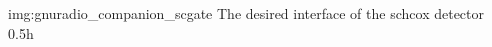 
                {img:gnuradio_companion_scgate}
                {The desired interface of the \gls{schcox} detector}
                {0.5}{h}
